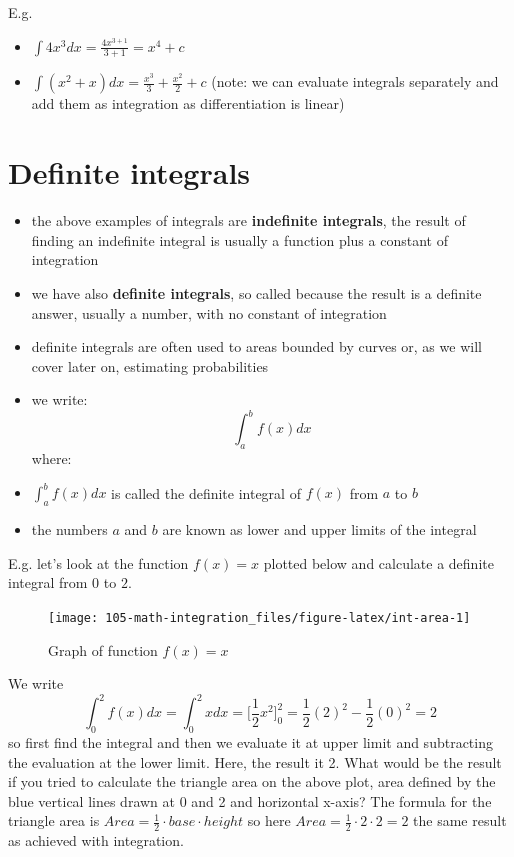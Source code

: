 \documentclass[
]{book}
\providecommand{\tightlist}{%
  \setlength{\itemsep}{0pt}\setlength{\parskip}{0pt}}
\theoremstyle{definition}
\theoremstyle{definition}
\theoremstyle{definition}
\theoremstyle{remark}
\begin{document}
E.g.

\begin{itemize}
\tightlist
\item
  \(\int 4x^3 dx = \frac{4x^{3+1}}{3+1}=x^4 + c\)
\item
  \(\int (x^2 + x) dx = \frac{x^3}{3} + \frac{x^2}{2} +c\) (note: we can evaluate integrals separately and add them as integration as differentiation is linear)
\end{itemize}

\hypertarget{definite-integrals}{%
\section{Definite integrals}\label{definite-integrals}}

\begin{itemize}
\item
  the above examples of integrals are \textbf{indefinite integrals}, the result of finding an indefinite integral is usually a function plus a constant of integration
\item
  we have also \textbf{definite integrals}, so called because the result is a definite answer, usually a number, with no constant of integration
\item
  definite integrals are often used to areas bounded by curves or, as we will cover later on, estimating probabilities
\item
  we write: \[\int_{a}^bf(x)dx\] where:
\item
  \(\int_{a}^bf(x)dx\) is called the definite integral of \(f(x)\) from \(a\) to \(b\)
\item
  the numbers \(a\) and \(b\) are known as lower and upper limits of the integral
\end{itemize}

E.g. let's look at the function \(f(x) = x\) plotted below and calculate a definite integral from \(0\) to \(2\).

\begin{figure}

{\centering \texttt{[image: 105-math-integration\_files/figure-latex/int-area-1]} 

}

\caption{Graph of function $f(x) = x$}\label{fig:int-area}
\end{figure}

We write \[\int_{0}^2f(x)dx = \int_{0}^2 xdx =  \Bigr[ \frac{1}{2}x^2\Bigr]_0^2 = \frac{1}{2}(2)^2 - \frac{1}{2}(0)^2 = 2\] so first find the integral and then we evaluate it at upper limit and subtracting the evaluation at the lower limit. Here, the result it 2. What would be the result if you tried to calculate the triangle area on the above plot, area defined by the blue vertical lines drawn at 0 and 2 and horizontal x-axis? The formula for the triangle area is \(Area = \frac{1}{2}\cdot base \cdot height\) so here \(Area = \frac{1}{2} \cdot 2 \cdot 2 = 2\) the same result as achieved with integration.
\end{document}
